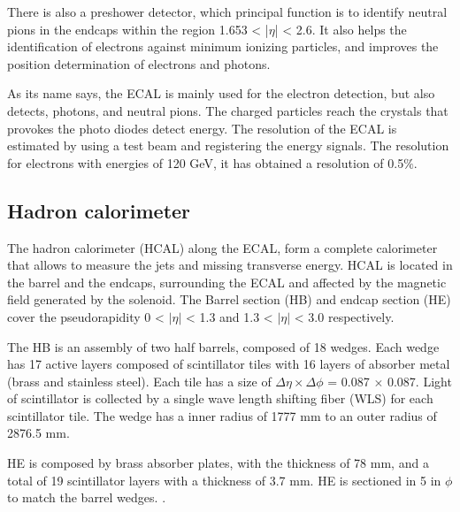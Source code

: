 There is also a preshower detector, which principal function is to identify neutral pions in the
endcaps within the region 1.653 < |$\eta$| < 2.6. It also helps the identification of electrons
against minimum ionizing particles, and improves the position determination of electrons and photons.


As its name says, the ECAL is mainly used for the electron detection, but also detects, photons, and neutral pions. The charged particles reach the crystals that provokes the photo diodes detect energy.
The resolution of the ECAL is estimated by using a test beam and registering the energy signals. The resolution for electrons with energies of 120 GeV, it has obtained a resolution of 0.5$\%$.
 


\subsection{Hadron calorimeter}
The hadron calorimeter (HCAL) along the ECAL, form a complete calorimeter that allows to measure the jets and missing transverse energy. HCAL is located in the barrel and the endcaps, surrounding the ECAL and affected by the magnetic field generated by the solenoid. The Barrel section (HB) and endcap section (HE) cover the pseudorapidity 0 < $|\eta|$ < 1.3 and 1.3 < $|\eta|$ < 3.0 respectively. 

The HB is an assembly of two half barrels, composed of 18 wedges. Each wedge has 17 active layers composed of scintillator tiles with 16 layers of absorber metal (brass and stainless steel). Each tile has a size of $\Delta \eta \times \Delta \phi$ = 0.087 $\times$ 0.087. Light of scintillator is collected by a single wave
length shifting fiber (WLS) for each scintillator tile. The wedge has a inner radius of 1777 mm to an outer radius of 2876.5 mm. 

HE is composed by brass absorber plates, with the thickness of 78 mm, and a total of 19 scintillator layers with a thickness of 3.7 mm. HE is sectioned in 5 in $\phi$ to match the barrel wedges.
. %

